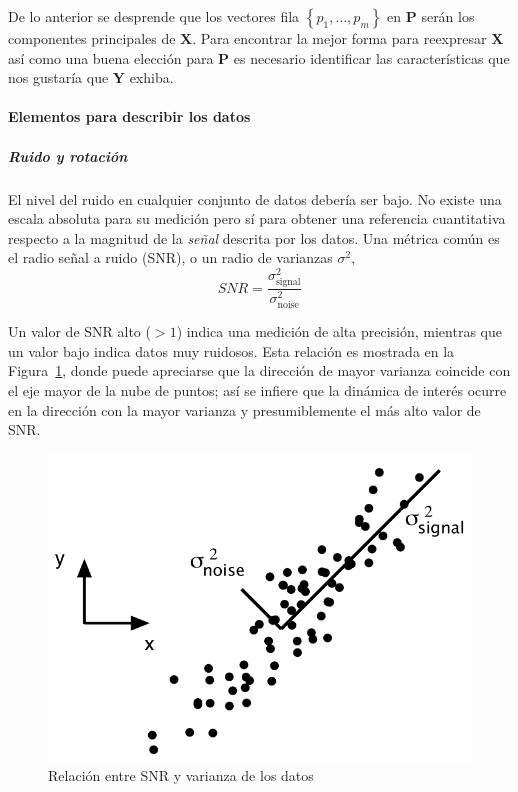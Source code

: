 \documentclass{article}
\begin{document}
De lo anterior se desprende que los vectores fila $\left \{ p_1,\ldots,p_m \right \}$ en $\mathbf{P}$ serán los componentes principales de $\mathbf{X}$.
Para encontrar la mejor forma para reexpresar $\mathbf{X}$ así como una buena elección para $\mathbf{P}$ es necesario identificar las características que nos gustaría que $\mathbf{Y}$ exhiba.

\paragraph{Elementos para describir los datos} 
\label{par:elementos_para_describir_los_datos}
\subparagraph{Ruido y rotación} 
\label{subp:ruido_y_rotacion}
El nivel del ruido en cualquier conjunto de datos debería ser bajo.
No existe una escala absoluta para su medición pero sí para obtener una referencia cuantitativa respecto a la magnitud de la \emph{señal} descrita por los datos.
Una métrica común es el radio señal a ruido (SNR), o un radio de varianzas $\sigma^2$,
$$
SNR = \frac{\sigma^2_{\text{signal}}}{\sigma^2_{\text{noise}}}
$$

Un valor de SNR alto ($>1$) indica una medición de alta precisión, mientras que un valor bajo indica datos muy ruidosos.
Esta relación es mostrada en la Figura~\ref{fig:snr-varianza}, donde puede apreciarse que la dirección de mayor varianza coincide con el eje mayor de la nube de puntos; así se infiere que la dinámica de interés ocurre en la dirección con la mayor varianza y presumiblemente el más alto valor de SNR.
\begin{figure}
	\centering
	\includegraphics[scale=0.35]{resources/images/snr}
	\caption{Relación entre SNR y varianza de los datos}
	\label{fig:snr-varianza}
\end{figure}
\end{document}
